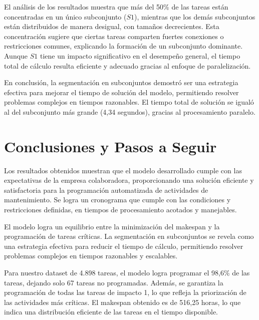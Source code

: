 \documentclass{article}
\begin{document}
El análisis de los resultados muestra que más del 50\% de las tareas están concentradas en un único subconjunto (\( S1 \)), mientras que los demás subconjuntos están distribuidos de manera desigual, con tamaños decrecientes. Esta concentración sugiere que ciertas tareas comparten fuertes conexiones o restricciones comunes, explicando la formación de un subconjunto dominante. Aunque \( S1 \) tiene un impacto significativo en el desempeño general, el tiempo total de cálculo resulta eficiente y adecuado gracias al enfoque de paralelización.

En conclusión, la segmentación en subconjuntos demostró ser una estrategia efectiva para mejorar el tiempo de solución del modelo, permitiendo resolver problemas complejos en tiempos razonables. El tiempo total de solución se igualó al del subconjunto más grande (4,34 segundos), gracias al procesamiento paralelo.

\section{Conclusiones y Pasos a Seguir}


Los resultados obtenidos muestran que el modelo desarrollado cumple con las expectativas de la empresa colaboradora, proporcionando una solución eficiente y satisfactoria para la programación automatizada de actividades de mantenimiento. Se logra un cronograma que cumple con las condiciones y restricciones definidas, en tiempos de procesamiento acotados y manejables.

El modelo logra un equilibrio entre la minimización del makespan y la programación de tareas críticas. La segmentación en subconjuntos se revela como una estrategia efectiva para reducir el tiempo de cálculo, permitiendo resolver problemas complejos en tiempos razonables y escalables.

Para nuestro dataset de 4.898 tareas, el modelo logra programar el 98,6\% de las tareas, dejando solo 67 tareas no programadas. Además, se garantiza la programación de todas las tareas de impacto 1, lo que refleja la priorización de las actividades más críticas. El makespan obtenido es de 516,25 horas, lo que indica una distribución eficiente de las tareas en el tiempo disponible.
\end{document}
